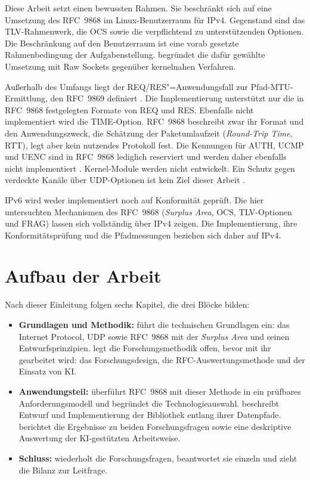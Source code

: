 Diese Arbeit setzt einen bewussten Rahmen. Sie beschränkt sich auf eine Umsetzung des RFC~9868 im
Linux-Benutzerraum für IPv4. Gegenstand sind das TLV-Rahmenwerk, die OCS sowie die verpflichtend zu unterstützenden
Optionen. Die Beschränkung auf den Benutzerraum ist eine vorab gesetzte Rahmenbedingung der Aufgabenstellung.
 begründet die dafür gewählte Umsetzung mit Raw Sockets gegenüber kernelnahen
Verfahren.

Außerhalb des Umfangs liegt der REQ/RES"=Anwendungsfall zur Pfad-MTU-Ermittlung, den RFC~9869 definiert
\cite{rfc9869}. Die Implementierung unterstützt nur die in RFC~9868 festgelegten Formate von REQ und RES. Ebenfalls
nicht implementiert wird die TIME-Option. RFC~9868 beschreibt zwar ihr Format und den Anwendungszweck, die Schätzung
der Paketumlaufzeit (\textit{Round-Trip Time}, RTT), legt aber kein nutzendes Protokoll fest. Die Kennungen für AUTH,
UCMP und UENC sind in RFC~9868 lediglich reserviert und werden daher ebenfalls nicht implementiert
\cite[Sec.~11.9, 12.1 und 12.2]{rfc9868}. Kernel-Module werden nicht entwickelt. Ein Schutz gegen verdeckte
Kanäle über UDP-Optionen ist kein Ziel dieser Arbeit \cite[Sec.~25.2]{rfc9868}.

IPv6 wird weder implementiert noch auf Konformität geprüft. Die hier untersuchten Mechanismen des RFC~9868
(\textit{Surplus Area}, OCS, TLV-Optionen und FRAG) lassen sich vollständig über IPv4 zeigen. Die
Implementierung, ihre Konformitätsprüfung und die Pfadmessungen beziehen sich daher auf IPv4.

\clearpage
\section{Aufbau der Arbeit}
\label{sec:aufbau}

Nach dieser Einleitung folgen sechs Kapitel, die drei Blöcke bilden:

\begin{itemize}
    \item \textbf{Grundlagen und Methodik:}  führt die technischen
        Grundlagen ein: das Internet Protocol, UDP sowie RFC~9868 mit der \textit{Surplus Area} und seinen
        Entwurfsprinzipien.  legt die Forschungsmethodik offen, bevor mit ihr
        gearbeitet wird: das Forschungsdesign, die RFC-Auswertungsmethode und der Einsatz von KI.
    \item \textbf{Anwendungsteil:}  überführt RFC~9868 mit dieser Methode in ein
        prüfbares Anforderungsmodell und begründet die Technologieauswahl.  beschreibt
        Entwurf und Implementierung der Bibliothek entlang ihrer Datenpfade. 
        berichtet die Ergebnisse zu beiden Forschungsfragen sowie eine deskriptive Auswertung der
        KI-gestützten Arbeitsweise.
    \item \textbf{Schluss:}  wiederholt die Forschungsfragen, beantwortet sie einzeln
        und zieht die Bilanz zur Leitfrage.
\end{itemize}

